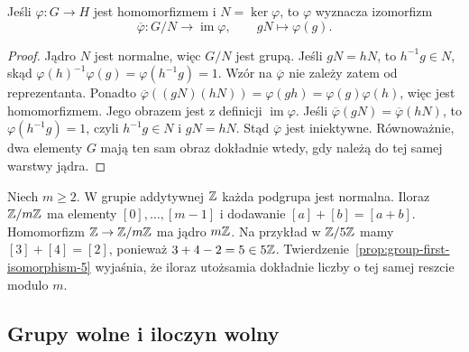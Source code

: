 \begin{stwierdzenie}
\label{prop:group-first-isomorphism-5}
Jeśli $\varphi:G\to H$ jest homomorfizmem i $N=\ker\varphi$,
to $\varphi$ wyznacza izomorfizm
\[
 \overline\varphi:G/N\longrightarrow\operatorname{im}\varphi,
 \qquad gN\longmapsto\varphi(g).
\]
\end{stwierdzenie}
\begin{proof}
Jądro $N$ jest normalne, więc $G/N$ jest grupą. Jeśli $gN=hN$,
to $h^{-1}g\in N$, skąd
$\varphi(h)^{-1}\varphi(g)=\varphi(h^{-1}g)=1$.
Wzór na $\overline\varphi$ nie zależy zatem od reprezentanta.
Ponadto
$\overline\varphi((gN)(hN))=\varphi(gh)
=\varphi(g)\varphi(h)$, więc jest homomorfizmem.
Jego obrazem jest z definicji $\operatorname{im}\varphi$.
Jeśli $\overline\varphi(gN)=\overline\varphi(hN)$, to
$\varphi(h^{-1}g)=1$, czyli $h^{-1}g\in N$ i $gN=hN$.
Stąd $\overline\varphi$ jest iniektywne. Równoważnie, dwa
elementy $G$ mają ten sam obraz dokładnie wtedy, gdy należą
do tej samej warstwy jądra.
\end{proof}

\begin{przyklad}
\label{prz:Zmodm-grupa-5}
Niech $m\geq2$.
W grupie addytywnej $\mathbb{Z}$ każda
podgrupa jest normalna.
Iloraz $\mathbb{Z}/m\mathbb{Z}$ ma elementy
$[0],\ldots,[m-1]$ i dodawanie
$[a]+[b]=[a+b]$. Homomorfizm
$\mathbb{Z}\to\mathbb{Z}/m\mathbb{Z}$ ma jądro $m\mathbb{Z}$.
Na przykład w $\mathbb{Z}/5\mathbb{Z}$ mamy $[3]+[4]=[2]$, ponieważ
$3+4-2=5\in5\mathbb{Z}$. Twierdzenie~\ref{prop:group-first-isomorphism-5}
wyjaśnia, że iloraz utożsamia dokładnie liczby o tej samej
reszcie modulo $m$.
\end{przyklad}

\subsection*{Grupy wolne i iloczyn wolny}


